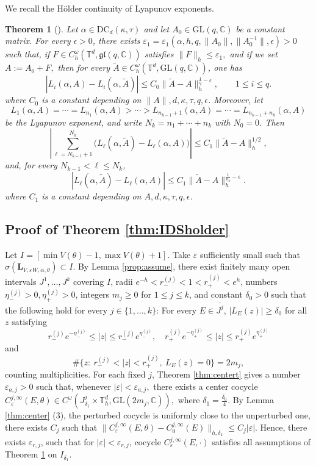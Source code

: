 \documentclass[reqno,11pt]{amsart}
\newtheorem{theorem}{Theorem}[section]
\def\GL{{\mathrm{GL}}}
\begin{document}
We  recall the H\"older continuity of Lyapunov exponents.
\begin{theorem}[\cite{GYZ22}]\label{thm:holder-GYZ}
Let $\alpha\in \mathrm{DC}_d(\kappa,\tau)$ and let
$A_0\in \mathrm{GL}(q,\mathbb C)$
be a constant matrix.  For every $\epsilon>0$, there exists
$\varepsilon_1=\varepsilon_1(\alpha,h,q,\|A_0\|,\|A_0^{-1}\|,\epsilon)>0$
such that, if
$F\in C_h^\omega(\mathbb T^d,\mathfrak{gl}(q,\mathbb C))$
satisfies
$\|F\|_h\le \varepsilon_1,$  and if we set
$A:=A_0+F,$ then
for every
$\widetilde A\in C_h^\omega(\mathbb T^d,\mathrm{GL}(q,\mathbb C))$, one has
$$
\left|L_i(\alpha,A)-L_i(\alpha,\widetilde A)\right|
\le C_0\|\widetilde A-A\|_h^{\frac1{q}-\epsilon},
\qquad 1\le i\le q.
$$where $C_0$ is a constant depending on $\|A\|, d, \kappa, \tau, q, \epsilon$.
Moreover, let
$$
L_1(\alpha,A)=\cdots=L_{n_1}(\alpha,A)
>\cdots> L_{n_{k-1}+1}(\alpha,A)=\cdots=L_{n_{k-1}+n_k}(\alpha,A)
$$
be the Lyapunov exponent, and write
$
N_k=n_1+\cdots+n_k
$
with $N_0=0$.
 Then
$$
\left|
\sum_{\ell=N_{k-1}+1}^{N_k}\bigl(L_\ell(\alpha,\widetilde A)-L_\ell(\alpha,A)\bigr)
\right|\le C_1\|\widetilde A-A\|_h^{1/2},
$$
and, for every $N_{k-1}<\ell\le N_k$,
$$
\left|L_\ell(\alpha,\widetilde A)-L_\ell(\alpha,A)\right|
\le C_1\|\widetilde A-A\|_h^{\frac1{n_k}-\epsilon}.
$$
where $C_1$ is a constant depending on $A, d, \kappa, \tau, q, \epsilon$.
\end{theorem}

\subsection*{Proof of Theorem \ref{thm:IDSholder}}
Let $I=[\min V(\theta)-1,\max V(\theta)+1]$. Take $\varepsilon$ sufficiently small such that $\sigma(\mathbf{L}_{V,\varepsilon W,\alpha,\theta})\subset I.$
By Lemma \ref{prop:assume}, there exist finitely many open intervals $J^1,\dots,J^k$ covering $I$, radii $e^{-h}<r_-^{(j)}<1<r_+^{(j)}<e^h$, numbers $\eta_-^{(j)}>0,\eta_+^{(j)}>0$, integers $m_j\ge 0$ for $1\leq j\leq k$, and constant $\delta_0>0$ such that the following hold for every $j\in\{1,\dots,k\}$:
For every $E\in \overline{J^j}$, $|L_{E}(z)|\ge \delta_0$ for all $z$ satisfying 
    $$
    r_-^{(j)}e^{-\eta_-^{(j)}}\le |z|\le r_-^{(j)}e^{\eta_-^{(j)}},\quad r_+^{(j)}e^{-\eta_+^{(j)}}\le |z|\le r_+^{(j)}e^{\eta_+^{(j)}}
    $$
and
    $$
    \#\{z:\ r_-^{(j)}<|z|<r_+^{(j)},\ L_{E}(z)=0\}=2m_j,
    $$
    counting multiplicities.
For each fixed $j$, Theorem \ref{thm:centert} gives a number
$\varepsilon_{a,j}>0$ such that, whenever
$
|\varepsilon|<\varepsilon_{a,j},
$ there exists a center cocycle
$
C_{\varepsilon}^{j,\infty}(E,\theta)
\in C^\omega(J^j_{\delta_1}\times\mathbb T_h^d,\GL(2m_j,\mathbb C)),
$ where $\delta_1=\frac{\delta_0}{4}.$
By Lemma \ref{thm:center} (3), the
perturbed cocycle is uniformly close to the unperturbed one,  there exists $C_j$ such that
$
\|C_\varepsilon^{j,\infty}(E,\theta)-C_0^{j,\infty}(E)\|_{h,\delta_1}
\le C_j|\varepsilon|.
$
Hence, there exists $\varepsilon_{r,j}$, such that for  $|\varepsilon|<\varepsilon_{r,j}$, cocycle
$ C_\varepsilon^{j,\infty}(E,\cdot)$
satisfies all assumptions of Theorem \ref{thm:holder-GYZ} on $I_{\delta_1}$.
\end{document}
